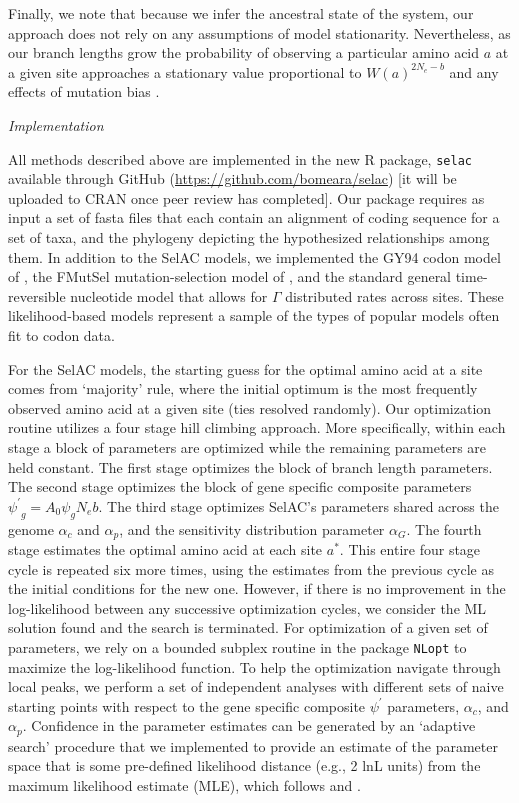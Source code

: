 \documentclass[12pt,letterpaper,fleqn]{article}
\renewcommand{\subsection}[1]{%
\bigskip
\begin{center}
\begin{large}
\normalfont\itshape #1
\end{large}
\end{center}}
\newcommand{\Ne}{\ensuremath{{N_e}}\xspace} %
\newcommand{\selac}{SelAC\xspace}
\newcommand{\alphac}{\ensuremath{\alpha_c}\xspace}
\newcommand{\alphag}{\ensuremath{\alpha_G}\xspace}
\newcommand{\alphap}{\ensuremath{\alpha_p}\xspace}
\newcommand{\aopt}{\ensuremath{a^*}\xspace}
\newcommand{\psiprime}{\ensuremath{\psi^\prime}\xspace}
\begin{document}
Finally, we note that because we infer the ancestral state of the system, our approach does not rely on any assumptions of model stationarity.
Nevertheless, as our branch lengths grow the probability of observing a particular amino acid $a$ at a given site approaches a stationary value proportional to $W(a)^{2 \Ne -b}$ and any effects of mutation bias \citep{SellaAndHirsh2005}.

\subsection{Implementation}\label{sec:implementation}
All methods described above are implemented in the new R package, \texttt{selac} available through GitHub (\url{https://github.com/bomeara/selac}) [it will be uploaded to CRAN once peer review has completed].
Our package requires as input a set of fasta files that each contain an alignment of coding sequence for a set of taxa, and the phylogeny depicting the hypothesized relationships among them.
In addition to the SelAC models, we implemented the GY94 codon model of \citet{GoldmanAndYang1994}, the FMutSel mutation-selection model of \citet{YangAndNielsen2008}, and the standard general time-reversible nucleotide model that allows for $\Gamma$ distributed rates across sites.
These likelihood-based models represent a sample of the types of popular models often fit to codon data.

For the \selac models, the starting guess for the optimal amino acid at a site comes from `majority' rule, where the initial optimum is the most frequently observed amino acid at a given site (ties resolved randomly).
Our optimization routine utilizes a four stage hill climbing approach.
More specifically, within each stage a block of parameters are optimized while the remaining parameters are held constant.
The first stage optimizes the block of branch length parameters.
The second stage optimizes the block of gene specific composite parameters $ \psiprime_g = A_0 \psi_g \Ne b$.
The third stage optimizes \selac's parameters shared across the genome $\alphac$ and $\alphap$, and the sensitivity distribution parameter $\alphag$.
The fourth stage estimates the optimal amino acid at each site \aopt.
This entire four stage cycle is repeated six more times, using the estimates from the previous cycle as the initial conditions for the new one.
However, if there is no improvement in the log-likelihood between any successive optimization cycles, we consider the ML solution found and the search is terminated.
For optimization of a given set of parameters, we rely on a bounded subplex routine \citep{Rowan1990} in the package \texttt{NLopt} \citep{Johnson2012} to maximize the log-likelihood function.
To help the optimization navigate through local peaks, we perform a set of independent analyses with different sets of naive starting points with respect to the gene specific composite $\psiprime$ parameters, $\alphac$, and $\alphap$.
Confidence in the parameter estimates can be generated by an `adaptive search' procedure that we implemented to provide an estimate of the parameter space that is some pre-defined likelihood distance (e.g., 2 lnL units) from the maximum likelihood estimate (MLE), which follows \citet{BeaulieuAndOMeara2016} and \citet{edwards1984likelihood}.
\end{document}
